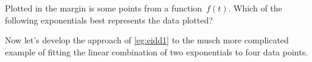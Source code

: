 \begin{activity}
Plotted in the margin is some points from a function~\(f(t)\).  
Which of the following exponentials best represents the data plotted?
\end{activity}


Now let's develop the approach of \autoref{eg:eidd1} to the musch more complicated example of fitting the linear combination of two exponentials to four data points.


